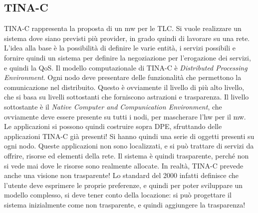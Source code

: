 \subsection{TINA-C}
TINA-C rappresenta la proposta di un mw per le TLC. Si vuole realizzare un sistema dove siano previsti più provider,
in grado quindi di lavorare su una rete. L'idea alla base è la possibilità di definire le varie entità, i servizi
possibili e fornire quindi un sistema per definire la negoziazione per l'erogazione dei servizi, e quindi la QoS.
Il modello computazionale di TINA-C è \textit{Distributed Processing Environment}.
Ogni nodo deve presentare delle funzionalità che permettono la comunicazione nel distribuito. Questo è ovviamente il
livello di più alto livello, che si basa su livelli sottostanti che forniscono astrazioni e trasparenza. Il livello
sottostante è il \textit{Native Computer and Compunication Environment}, che ovviamente deve essere presente su tutti
i nodi, per mascherare l'hw per il mw.
Le applicazioni si possono quindi costruire sopra DPE, sfruttando delle applicazioni TINA-C già presenti! Si hanno
quindi una serie di oggetti presenti su ogni nodo. Queste applicazioni non sono localizzati, e si può trattare di
servizi da offrire, risorse ed elementi della rete. Il sistema è quindi trasparente, perché non si vede mai dove le
risorse sono realmente allocate.
In realtà, TINA-C prevede anche una visione non trasparente! Lo standard del 2000 infatti definisce che l'utente deve
esprimere le proprie preferenze, e quindi per poter sviluppare un modello complesso, si deve tener conto della
locazione: si può progettare il sistema inizialmente come non trasparente, e quindi aggiungere la trasparenza!

